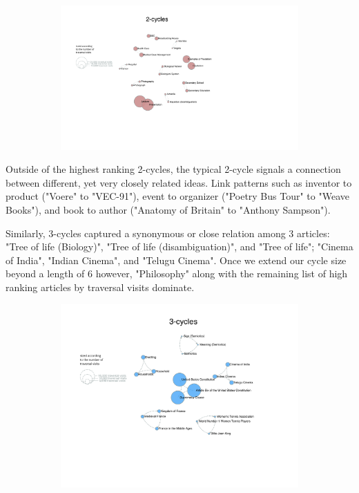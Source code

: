 \documentclass[twoside]{article}
\begin{document}
\begin{figure}[H]
\centering
\caption{highest ranking 2-cycles}
    \begin{subfigure}[b]{0.8\textwidth}
        \includegraphics[width=\textwidth]{graphics/2_cycles.pdf}
    \end{subfigure}
\end{figure}



Outside of the highest ranking 2-cycles, the typical 2-cycle signals a connection between different, yet very closely related ideas. 
Link patterns such as inventor to product ("Voere" to "VEC-91"), event to organizer ("Poetry Bus Tour" to "Weave Books"), and book to author ("Anatomy of Britain" to "Anthony Sampson").

Similarly, 3-cycles captured a synonymous or close relation among 3 articles: "Tree of life (Biology)", "Tree of life (disambiguation)", 
and "Tree of life"; "Cinema of India", "Indian Cinema", and "Telugu Cinema". Once we extend our cycle size beyond a length of 6 however, 
"Philosophy" along with the remaining list of high ranking articles by traversal visits dominate.

\begin{figure}[H]
\centering
\caption{highest ranking 3-cycles}
    \begin{subfigure}[b]{0.8\textwidth}
        \includegraphics[width=\textwidth]{graphics/3_cycles.pdf}
    \end{subfigure}
\end{figure}
\end{document}
